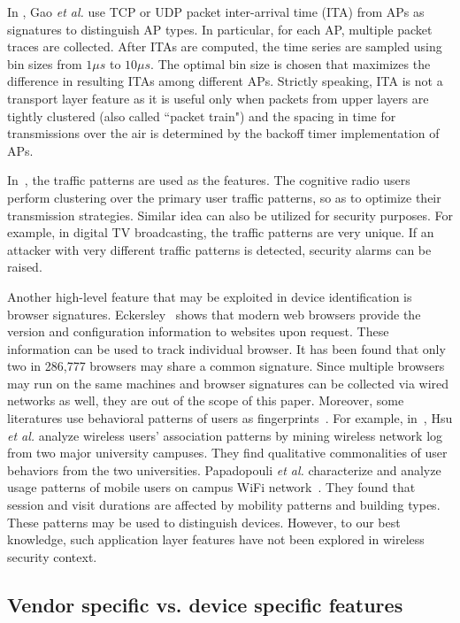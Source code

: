 \documentclass[journal,draftcls,onecolumn,11pt]{IEEEtran}
\begin{document}
In \cite{Gao}, Gao {\it et al.} use TCP or UDP packet inter-arrival time (ITA) from APs as signatures to distinguish AP types. In particular, for each AP, multiple packet traces are collected. After ITAs are computed, the time series are sampled using bin sizes from $1\mu s$ to $10\mu s$. The optimal bin size is chosen that maximizes the difference in resulting ITAs among different APs. Strictly speaking, ITA is not a transport layer feature as it is useful only when packets from upper layers are tightly clustered (also called ``packet train") and the spacing in time for transmissions over the air is determined by the backoff timer implementation of APs.

In~\cite{M.EjazAhmed2014}, the traffic patterns are used as the features. The cognitive radio users perform clustering over the primary user traffic patterns, so as to optimize their transmission strategies. Similar idea can also be utilized for security purposes. For example, in digital TV broadcasting, the traffic patterns are very unique. If an attacker with very different traffic patterns is detected, security alarms can be raised.

Another high-level feature that may be exploited in device identification is browser signatures. Eckersley~\cite{Eckersley} shows that modern web browsers provide the version and configuration information  to websites upon request. These information can be used to track individual browser. It has been found that only two in 286,777 browsers may share a common signature. Since multiple browsers may run on the same machines and browser signatures can be collected via wired networks as well, they are out of the scope of this paper. Moreover, some literatures use behavioral patterns of users as fingerprints~\cite{Hsu2007,papadopouli2005characterizing}. For example, in~\cite{Hsu2007}, Hsu {\it et al.} analyze wireless users' association patterns by mining wireless network log from two major university campuses. They  find qualitative commonalities of user behaviors from the two universities. Papadopouli {\it et al.} characterize and analyze usage patterns of mobile users on campus WiFi network~\cite{papadopouli2005characterizing}. They found that session and visit durations are affected by mobility patterns and building types. These patterns may be used to distinguish devices. However, to our best knowledge, such application layer features have not been explored in wireless security context.

\subsection{Vendor specific vs. device specific features}
\end{document}
